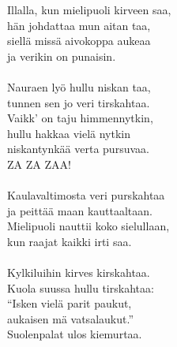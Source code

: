 
            Illalla, kun mielipuoli kirveen saa, \\
            hän johdattaa mun aitan taa, \\
            siellä missä aivokoppa aukeaa \\
            ja verikin on punaisin. \\
\hspace{10mm} \\
            Nauraen lyö hullu niskan taa, \\
            tunnen sen jo veri tirskahtaa. \\
            Vaikk’ on taju himmennytkin, \\
            hullu hakkaa vielä nytkin \\
            niskantynkää verta pursuvaa. \\
            ZA ZA ZAA! \\
\hspace{10mm} \\
            Kaulavaltimosta veri purskahtaa \\
            ja peittää maan kauttaaltaan. \\
            Mielipuoli nauttii koko sielullaan, \\
            kun raajat kaikki irti saa. \\
\hspace{10mm} \\
            Kylkiluihin kirves kirskahtaa. \\
            Kuola suussa hullu tirskahtaa: \\
            “Isken vielä parit paukut, \\
            aukaisen mä vatsalaukut.” \\
            Suolenpalat ulos kiemurtaa. \\
\hspace{10mm} \\
